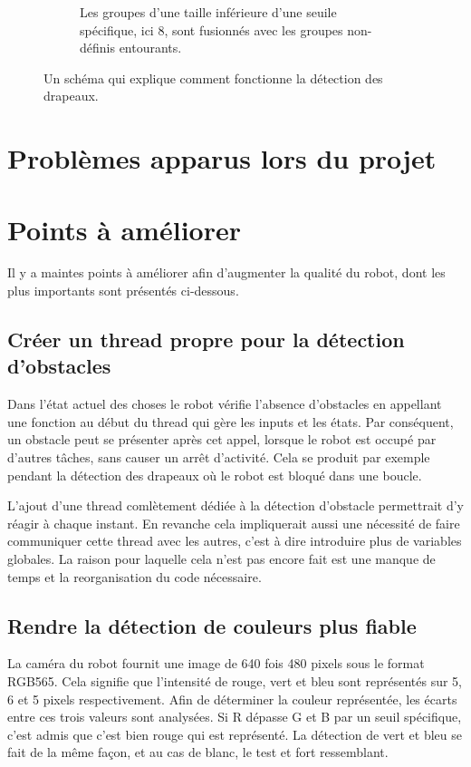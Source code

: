 \documentclass{article}
\begin{document}
\begin{figure}[!ht]
\begin{subfigure}{\textwidth}
            \caption{Les groupes d'une taille inférieure d'une seuile spécifique, ici 8, sont fusionnés avec les groupes non-définis entourants.}
        \end{subfigure}
        \caption{Un schéma qui explique comment fonctionne la détection des drapeaux.}
    \end{figure}

    \section{Problèmes apparus lors du projet}


    \section{Points à améliorer}
    Il y a maintes points à améliorer afin d'augmenter la qualité du robot, dont les plus importants sont présentés ci-dessous.

    \subsection{Créer un thread propre pour la détection d'obstacles}
    Dans l'état actuel des choses le robot vérifie l'absence d'obstacles en appellant une fonction au début du thread qui gère les inputs et les états.
    Par conséquent, un obstacle peut se présenter après cet appel, lorsque le robot est occupé par d'autres tâches, sans causer un arrêt d'activité.
    Cela se produit par exemple pendant la détection des drapeaux où le robot est bloqué dans une boucle.

    L'ajout d'une thread comlètement dédiée à la détection d'obstacle permettrait d'y réagir à chaque instant.
    En revanche cela impliquerait aussi une nécessité de faire communiquer cette thread avec les autres, c'est à dire introduire plus de variables globales.
    La raison pour laquelle cela n'est pas encore fait est une manque de temps et la reorganisation du code nécessaire.

    \subsection{Rendre la détection de couleurs plus fiable}
    La caméra du robot fournit une image de 640 fois 480 pixels sous le format RGB565.
    Cela signifie que l'intensité de rouge, vert et bleu sont représentés sur 5, 6 et 5 pixels respectivement.
    Afin de déterminer la couleur représentée, les écarts entre ces trois valeurs sont analysées.
    Si R dépasse G et B par un seuil spécifique, c'est admis que c'est bien rouge qui est représenté.
    La détection de vert et bleu se fait de la même façon, et au cas de blanc, le test et fort ressemblant.
    
\end{document}
